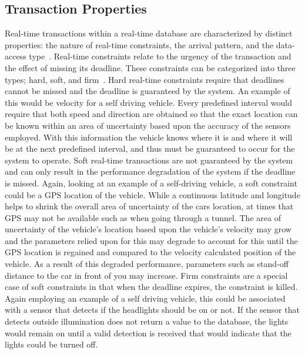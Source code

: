 \documentclass[conference]{IEEEtran}
\begin{document}
\subsection{Transaction Properties}
Real-time transactions within a real-time database are characterized by distinct properties: the nature of real-time constraints, the arrival pattern, and the data-access type~\cite{Erickson}. Real-time constraints relate to the urgency of the transaction and the effect of missing its deadline. These constraints can be categorized into three types; hard, soft, and firm~\cite{Halpin}. Hard real-time constraints require that deadlines cannot be missed and the deadline is guaranteed by the system. An example of this would be velocity for a self driving vehicle. Every predefined interval would require that both speed and direction are obtained so that the exact location can be known within an area of uncertainty based upon the accuracy of the sensors employed. With this information the vehicle knows where it is and where it will be at the next predefined interval, and thus must be guaranteed to occur for the system to operate.
Soft real-time transactions are not guaranteed by the system and can only result in the performance degradation of the system if the deadline is missed. Again, looking at an example of a self-driving vehicle, a soft constraint could be a GPS location of the vehicle. While a continuous latitude and longitude helps to shrink the overall area of uncertainty of the cars location, at times that GPS may not be available such as when going through a tunnel. The area of uncertainty of the vehicle's location based upon the vehicle's velocity may grow and the parameters relied upon for this may degrade to account for this until the GPS location is regained and compared to the velocity calculated position of the vehicle. As a result of this degraded performance,  parameters such as stand-off distance to the car in front of you may increase.
Firm constraints are a special case of soft constraints in that when the deadline expires, the constraint is killed. Again employing an example of a self driving vehicle, this could be associated with a sensor that detects if the headlights should be on or not. If the sensor that detects outside illumination does not return a value to the database, the lights would remain on until a valid detection is received that would indicate that the lights could be turned off.\\
\end{document}
